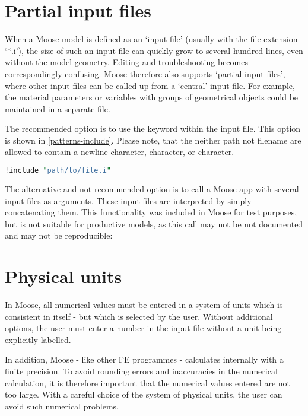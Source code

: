 \section{Partial input files}
\label{chap:patterns-partial-input-files}

When a Moose model is defined as an
\href{https://mooseframework.inl.gov/application_usage/input_syntax.html}{‘input
    file’} (usually with the file extension ‘*.i’), the size of such an input file
can quickly grow to several hundred lines, even without the model geometry.
Editing and troubleshooting becomes correspondingly confusing. Moose therefore
also supports ‘partial input files’, where other input files can be called up
from a ‘central’ input file. For example, the material parameters or variables
with groups of geometrical objects could be maintained in a separate file.

The recommended option is to use the  keyword within the
input file. This option is shown in \autoref{patterns-include}. Please note,
that the neither path not filename are allowed to contain a newline character,
\codeword{#} character, or \codeword{[} character.

\begin{lstlisting}[language=perl, caption={Include anpther input file},label={patterns-include}]
!include "path/to/file.i"
\end{lstlisting}

The alternative and not recommended option is to call a Moose app with several
input files as arguments. These input files are interpreted by simply
concatenating them. This functionality was included in Moose for test purposes,
but is not suitable for productive models, as this call may not be not
documented and may not be reproducible:


\section{Physical units}
\label{chap:patterns-physical-units}

In Moose, all numerical values must be entered in a system of units which is
consistent in itself - but which is selected by the user. Without additional
options, the user must enter a number in the input file without a unit being
explicitly labelled.

In addition, Moose - like other FE programmes - calculates internally with a
finite precision. To avoid rounding errors and inaccuracies in the numerical
calculation, it is therefore important that the numerical values entered are
not too large. With a careful choice of the system of physical units, the user
can avoid such numerical problems.

